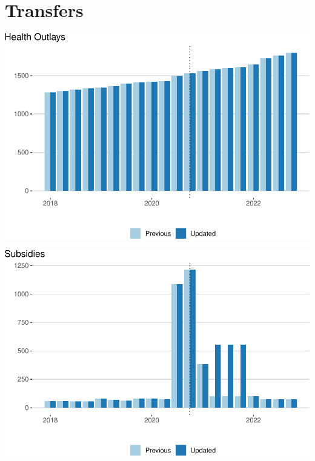 \documentclass[
]{article}
\begin{document}
\hypertarget{transfers}{%
\section{Transfers}\label{transfers}}

\begin{center}\includegraphics{update-changes-levels_files/figure-latex/health-outlays-1} \end{center}

\begin{center}\includegraphics{update-changes-levels_files/figure-latex/subsidies-1} \end{center}
\end{document}
